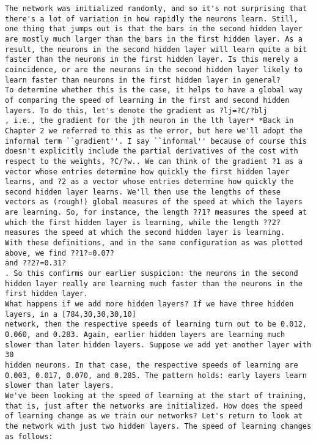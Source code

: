 \begin{lstlisting}
The network was initialized randomly, and so it's not surprising that there's a lot of variation in how rapidly the neurons learn. Still, one thing that jumps out is that the bars in the second hidden layer are mostly much larger than the bars in the first hidden layer. As a result, the neurons in the second hidden layer will learn quite a bit faster than the neurons in the first hidden layer. Is this merely a coincidence, or are the neurons in the second hidden layer likely to learn faster than neurons in the first hidden layer in general?
To determine whether this is the case, it helps to have a global way of comparing the speed of learning in the first and second hidden layers. To do this, let's denote the gradient as ?lj=?C/?blj
, i.e., the gradient for the jth neuron in the lth layer* *Back in Chapter 2 we referred to this as the error, but here we'll adopt the informal term ``gradient''. I say ``informal'' because of course this doesn't explicitly include the partial derivatives of the cost with respect to the weights, ?C/?w.. We can think of the gradient ?1 as a vector whose entries determine how quickly the first hidden layer learns, and ?2 as a vector whose entries determine how quickly the second hidden layer learns. We'll then use the lengths of these vectors as (rough!) global measures of the speed at which the layers are learning. So, for instance, the length ??1? measures the speed at which the first hidden layer is learning, while the length ??2?
measures the speed at which the second hidden layer is learning.
With these definitions, and in the same configuration as was plotted above, we find ??1?=0.07?
and ??2?=0.31?
. So this confirms our earlier suspicion: the neurons in the second hidden layer really are learning much faster than the neurons in the first hidden layer.
What happens if we add more hidden layers? If we have three hidden layers, in a [784,30,30,30,10]
network, then the respective speeds of learning turn out to be 0.012, 0.060, and 0.283. Again, earlier hidden layers are learning much slower than later hidden layers. Suppose we add yet another layer with 30
hidden neurons. In that case, the respective speeds of learning are 0.003, 0.017, 0.070, and 0.285. The pattern holds: early layers learn slower than later layers.
We've been looking at the speed of learning at the start of training, that is, just after the networks are initialized. How does the speed of learning change as we train our networks? Let's return to look at the network with just two hidden layers. The speed of learning changes as follows:


\end{lstlisting}
